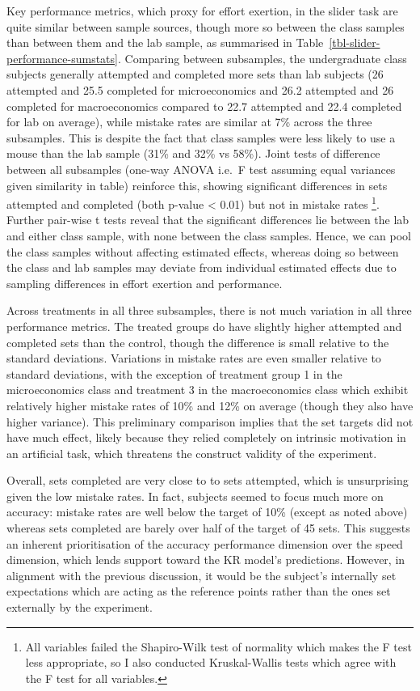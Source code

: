 \documentclass[12pt, letterpaper, DIV=11, numbers=noendperiod]{article}
\begin{document}
Key performance metrics, which proxy for effort exertion, in the slider task are quite similar between sample sources, though more so between the class samples than between them and the lab sample, as summarised in Table~\ref{tbl-slider-performance-sumstats}. Comparing between subsamples, the undergraduate class subjects generally attempted and completed more sets than lab subjects (26 attempted and 25.5 completed for microeconomics and 26.2 attempted and 26 completed for macroeconomics compared to 22.7 attempted and 22.4 completed for lab on average), while mistake rates are similar at 7\% across the three subsamples. This is despite the fact that class samples were less likely to use a mouse than the lab sample (31\% and 32\% vs 58\%). Joint tests of difference between all subsamples (one-way ANOVA i.e.~F test assuming equal variances given similarity in table) reinforce this, showing significant differences in sets attempted and completed (both p-value \textless{} 0.01) but not in mistake rates \footnote{All variables failed the Shapiro-Wilk test of normality which makes the F test less appropriate, so I also conducted Kruskal-Wallis tests which agree with the F test for all variables.}. Further pair-wise t tests reveal that the significant differences lie between the lab and either class sample, with none between the class samples. Hence, we can pool the class samples without affecting estimated effects, whereas doing so between the class and lab samples may deviate from individual estimated effects due to sampling differences in effort exertion and performance.

Across treatments in all three subsamples, there is not much variation in all three performance metrics. The treated groups do have slightly higher attempted and completed sets than the control, though the difference is small relative to the standard deviations. Variations in mistake rates are even smaller relative to standard deviations, with the exception of treatment group 1 in the microeconomics class and treatment 3 in the macroeconomics class which exhibit relatively higher mistake rates of 10\% and 12\% on average (though they also have higher variance). This preliminary comparison implies that the set targets did not have much effect, likely because they relied completely on intrinsic motivation in an artificial task, which threatens the construct validity of the experiment.

Overall, sets completed are very close to to sets attempted, which is unsurprising given the low mistake rates. In fact, subjects seemed to focus much more on accuracy: mistake rates are well below the target of 10\% (except as noted above) whereas sets completed are barely over half of the target of 45 sets. This suggests an inherent prioritisation of the accuracy performance dimension over the speed dimension, which lends support toward the KR model's predictions. However, in alignment with the previous discussion, it would be the subject's internally set expectations which are acting as the reference points rather than the ones set externally by the experiment.
\end{document}
